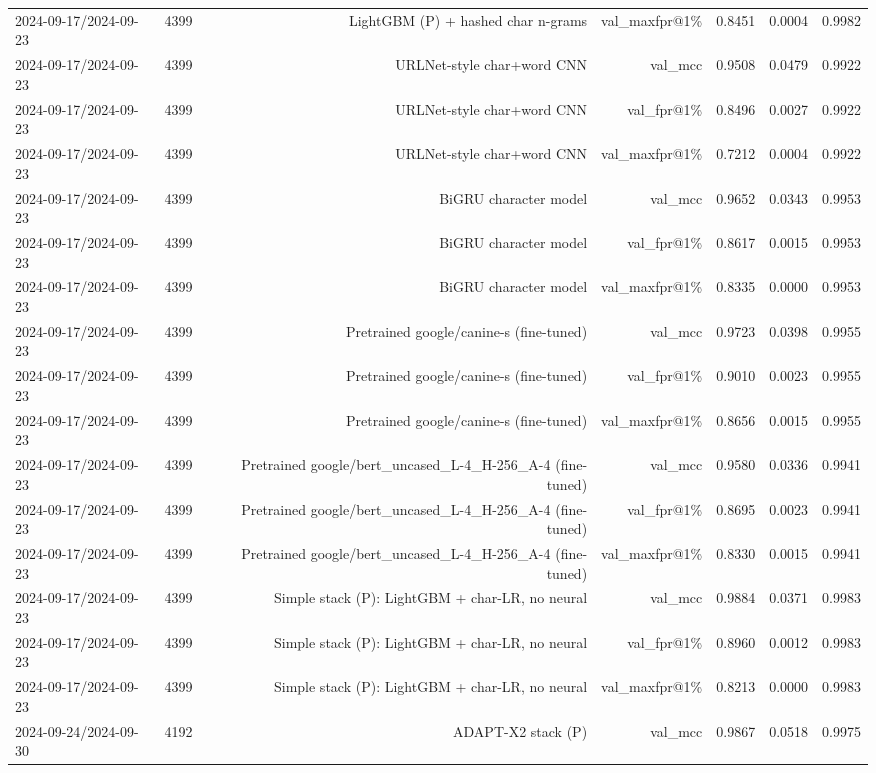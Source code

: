 \begin{table}[t]
\begin{tabular}{llrrrrr}
2024-09-17/2024-09-23 & 4399 & LightGBM (P) + hashed char n-grams & val\_maxfpr@1\% & 0.8451 & 0.0004 & 0.9982 \\
2024-09-17/2024-09-23 & 4399 & URLNet-style char+word CNN & val\_mcc & 0.9508 & 0.0479 & 0.9922 \\
2024-09-17/2024-09-23 & 4399 & URLNet-style char+word CNN & val\_fpr@1\% & 0.8496 & 0.0027 & 0.9922 \\
2024-09-17/2024-09-23 & 4399 & URLNet-style char+word CNN & val\_maxfpr@1\% & 0.7212 & 0.0004 & 0.9922 \\
2024-09-17/2024-09-23 & 4399 & BiGRU character model & val\_mcc & 0.9652 & 0.0343 & 0.9953 \\
2024-09-17/2024-09-23 & 4399 & BiGRU character model & val\_fpr@1\% & 0.8617 & 0.0015 & 0.9953 \\
2024-09-17/2024-09-23 & 4399 & BiGRU character model & val\_maxfpr@1\% & 0.8335 & 0.0000 & 0.9953 \\
2024-09-17/2024-09-23 & 4399 & Pretrained google/canine-s (fine-tuned) & val\_mcc & 0.9723 & 0.0398 & 0.9955 \\
2024-09-17/2024-09-23 & 4399 & Pretrained google/canine-s (fine-tuned) & val\_fpr@1\% & 0.9010 & 0.0023 & 0.9955 \\
2024-09-17/2024-09-23 & 4399 & Pretrained google/canine-s (fine-tuned) & val\_maxfpr@1\% & 0.8656 & 0.0015 & 0.9955 \\
2024-09-17/2024-09-23 & 4399 & Pretrained google/bert\_uncased\_L-4\_H-256\_A-4 (fine-tuned) & val\_mcc & 0.9580 & 0.0336 & 0.9941 \\
2024-09-17/2024-09-23 & 4399 & Pretrained google/bert\_uncased\_L-4\_H-256\_A-4 (fine-tuned) & val\_fpr@1\% & 0.8695 & 0.0023 & 0.9941 \\
2024-09-17/2024-09-23 & 4399 & Pretrained google/bert\_uncased\_L-4\_H-256\_A-4 (fine-tuned) & val\_maxfpr@1\% & 0.8330 & 0.0015 & 0.9941 \\
2024-09-17/2024-09-23 & 4399 & Simple stack (P): LightGBM + char-LR, no neural & val\_mcc & 0.9884 & 0.0371 & 0.9983 \\
2024-09-17/2024-09-23 & 4399 & Simple stack (P): LightGBM + char-LR, no neural & val\_fpr@1\% & 0.8960 & 0.0012 & 0.9983 \\
2024-09-17/2024-09-23 & 4399 & Simple stack (P): LightGBM + char-LR, no neural & val\_maxfpr@1\% & 0.8213 & 0.0000 & 0.9983 \\
2024-09-24/2024-09-30 & 4192 & ADAPT-X2 stack (P) & val\_mcc & 0.9867 & 0.0518 & 0.9975 \\

\end{tabular}
\end{table}
